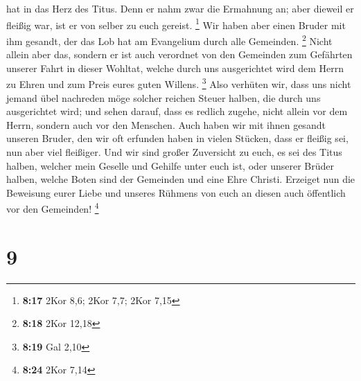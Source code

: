 hat in das Herz des Titus.  Denn er nahm zwar die
Ermahnung an; aber dieweil er fleißig war, ist er von selber zu euch
gereist. \footnote{\textbf{8:17} 2Kor 8,6; 2Kor 7,7; 2Kor 7,15}
 Wir haben aber einen Bruder mit ihm gesandt, der das Lob
hat am Evangelium durch alle Gemeinden. \footnote{\textbf{8:18} 2Kor
  12,18}  Nicht allein aber das, sondern er ist auch
verordnet von den Gemeinden zum Gefährten unserer Fahrt in dieser
Wohltat, welche durch uns ausgerichtet wird dem Herrn zu Ehren und zum
Preis eures guten Willens. \footnote{\textbf{8:19} Gal 2,10}
 Also verhüten wir, dass uns nicht jemand übel nachreden
möge solcher reichen Steuer halben, die durch uns ausgerichtet wird;
 und sehen darauf, dass es redlich zugehe, nicht allein
vor dem Herrn, sondern auch vor den Menschen.  Auch haben
wir mit ihnen gesandt unseren Bruder, den wir oft erfunden haben in
vielen Stücken, dass er fleißig sei, nun aber viel fleißiger.
 Und wir sind großer Zuversicht zu euch, es sei des Titus
halben, welcher mein Geselle und Gehilfe unter euch ist, oder unserer
Brüder halben, welche Boten sind der Gemeinden und eine Ehre Christi.
 Erzeiget nun die Beweisung eurer Liebe und unseres
Rühmens von euch an diesen auch öffentlich vor den Gemeinden!
\footnote{\textbf{8:24} 2Kor 7,14}

\hypertarget{section-8}{%
\section{9}\label{section-8}}

